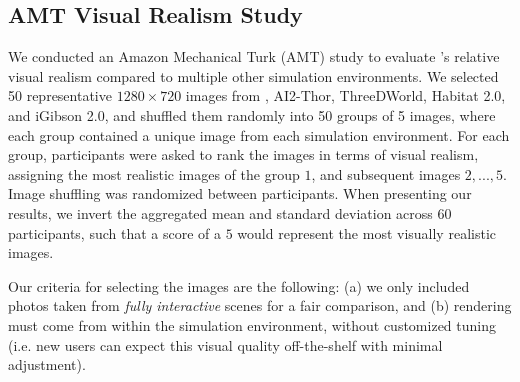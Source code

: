 


\subsection{AMT Visual Realism Study}
\label{amt_study_appx}

We conducted an Amazon Mechanical Turk (AMT) study to evaluate \simulator's relative visual realism compared to multiple other simulation environments. We selected 50 representative $1280 \times 720$ images from \simulator, AI2-Thor, ThreeDWorld, Habitat 2.0, and iGibson 2.0, and shuffled them randomly into 50 groups of 5 images, where each group contained a unique image from each simulation environment. For each group, participants were asked to rank the images in terms of visual realism, assigning the most realistic images of the group $1$, and subsequent images $2, ..., 5$. Image shuffling was randomized between participants. When presenting our results, we invert the aggregated mean and standard deviation across 60 participants, such that a score of a $5$ would represent the most visually realistic images.

Our criteria for selecting the images are the following: (a) we only included photos taken from \textit{fully interactive} scenes for a fair comparison, and (b) rendering must come from within the simulation environment, without customized tuning (i.e. new users can expect this visual quality off-the-shelf with minimal adjustment).

